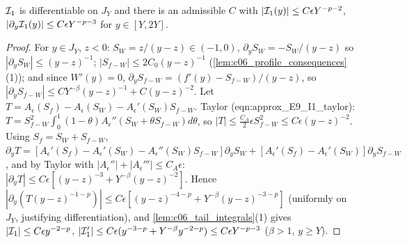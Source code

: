 \begin{lemma}
  \label{lem:c06_E9_I1}
  $\mathcal{I}_1$ is differentiable on $J_Y$ and there is an admissible $C$ with
  $|\mathcal{I}_1(y)|\le C\epsilon Y^{-p-2}$, $|\partial_y\mathcal{I}_1(y)|\le C\epsilon Y^{-p-3}$ for $y\in[Y,2Y]$.
\end{lemma}
\begin{proof}
  For $y\in J_Y$, $z<0$: $S_W=z/(y-z)\in(-1,0)$, $\partial_yS_W=-S_W/(y-z)$ so $|\partial_yS_W|\le(y-z)^{-1}$;
  $|S_{f-W}|\le2C_0(y-z)^{-1}$ (\cref{lem:c06_profile_consequences}(1)); and since $W'(y)=0$,
  $\partial_yS_{f-W}=(f'(y)-S_{f-W})/(y-z)$, so $|\partial_yS_{f-W}|\le CY^{-\beta}(y-z)^{-1}+C(y-z)^{-2}$.
  Let $T=A_\epsilon(S_f)-A_\epsilon(S_W)-A_\epsilon'(S_W)S_{f-W}$. Taylor (eqn:approx\_E9\_I1\_taylor):
  $T=S_{f-W}^2\int_0^1(1-\theta)A_\epsilon''(S_W+\theta S_{f-W})d\theta$, so $|T|\le\frac{C_A}2\epsilon S_{f-W}^2\le C\epsilon(y-z)^{-2}$.
  Using $S_f=S_W+S_{f-W}$,
  $\partial_yT=[A_\epsilon'(S_f)-A_\epsilon'(S_W)-A_\epsilon''(S_W)S_{f-W}]\partial_yS_W+[A_\epsilon'(S_f)-A_\epsilon'(S_W)]\partial_yS_{f-W}$,
  and by Taylor with $|A_\epsilon''|+|A_\epsilon'''|\le C_A\epsilon$:
  $|\partial_yT|\le C\epsilon[(y-z)^{-3}+Y^{-\beta}(y-z)^{-2}]$.
  Hence $|\partial_y(T(y-z)^{-1-p})|\le C\epsilon[(y-z)^{-4-p}+Y^{-\beta}(y-z)^{-3-p}]$ (uniformly on $J_Y$, justifying differentiation),
  and \cref{lem:c06_tail_integrals}(1) gives $|\mathcal{I}_1|\le C\epsilon y^{-2-p}$, $|\mathcal{I}_1'|\le C\epsilon(y^{-3-p}+Y^{-\beta}y^{-2-p})\le C\epsilon Y^{-p-3}$ ($\beta>1$, $y\ge Y$).
\end{proof}


